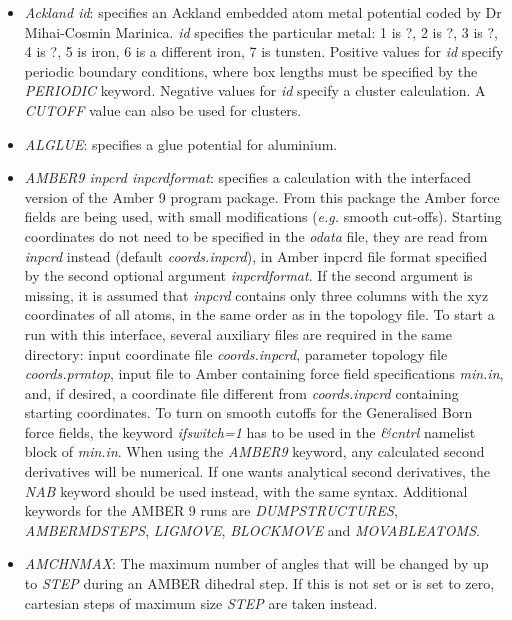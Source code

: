 \documentclass[12pt,a4paper,dvips]{article}
\begin{document}
\begin{itemize}
\item {\it Ackland id\/}: specifies an Ackland embedded atom metal potential%
coded by Dr Mihai-Cosmin Marinica.
{\it id} specifies the particular metal: 1 is ?, 2 is ?, 3 is ?, 4 is ?, 5 is iron, 6 is a different iron,
7 is tunsten.
Positive values for {\it id} specify periodic boundary conditions, where box lengths must be
specified by the {\it PERIODIC\/} keyword. 
Negative values for {\it id\/} specify a cluster calculation. A {\it CUTOFF\/} value can also
be used for clusters.

\item {\it ALGLUE\/}: specifies a glue potential for aluminium.

\item {\it AMBER9 inpcrd inpcrdformat\/}: specifies a calculation with the interfaced
version of the Amber 9 program package. From this package the Amber force fields
are being used, with small modifications ({\it e.g.} smooth cut-offs).
Starting coordinates do not need to be specified in the {\it odata} file, they
are read from {\it inpcrd} instead (default {\it coords.inpcrd}), in Amber inpcrd
file format specified by the second optional argument {\it inpcrdformat}.
If the second argument is missing, it is assumed that {\it inpcrd} contains
only three columns with the xyz coordinates of all atoms, in the same order
as in the topology file. To start a run with this interface,
several auxiliary files are required in the same directory: input coordinate file
{\it coords.inpcrd}, parameter topology file {\it coords.prmtop},
input file to Amber containing force field specifications {\it min.in}, and, if
desired, a coordinate file different from {\it coords.inpcrd} containing
starting coordinates.
To turn on smooth cutoffs for the Generalised Born force fields, the keyword
{\it ifswitch=1} has to be used in the {\it \&cntrl} namelist block of {\it min.in}.
When using the {\it AMBER9} keyword, any calculated second derivatives will be
numerical. If one wants analytical second derivatives, the {\it NAB} keyword
should be used instead, with the same syntax. 
Additional keywords for the AMBER 9 runs are {\it DUMPSTRUCTURES}, {\it AMBERMDSTEPS},
{\it LIGMOVE}, {\it BLOCKMOVE} and {\it MOVABLEATOMS}.

\item {\it AMCHNMAX\/}: The maximum number of angles that will be changed by up to {\it STEP\/} during an 
AMBER dihedral step. If this is not set or is set to zero, cartesian steps of maximum size {\it STEP\/} are taken 
instead. 


\end{itemize}
\end{document}
